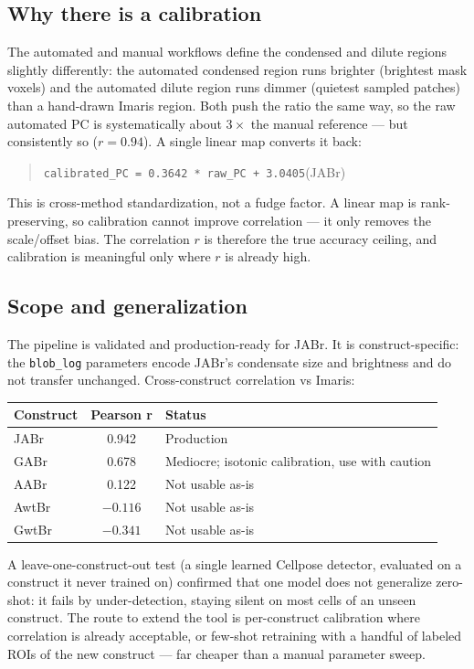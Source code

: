 \documentclass[11pt]{article}
\newcommand{\code}[1]{\texttt{\small #1}}
\begin{document}
\subsection{Why there is a calibration}
The automated and manual workflows define the condensed and dilute regions slightly
differently: the automated condensed region runs brighter (brightest mask voxels) and the
automated dilute region runs dimmer (quietest sampled patches) than a hand-drawn Imaris
region. Both push the ratio the same way, so the raw automated PC is systematically about
$3\times$ the manual reference --- but consistently so ($r = 0.94$). A single linear map converts it back:
\begin{quote}\code{calibrated\_PC = 0.3642 * raw\_PC + 3.0405}\quad (JABr)\end{quote}
This is cross-method standardization, not a fudge factor. A linear map is rank-preserving,
so calibration cannot improve correlation --- it only removes the scale/offset bias. The
correlation $r$ is therefore the true accuracy ceiling, and calibration is meaningful only where $r$ is already high.

\subsection{Scope and generalization}
The pipeline is validated and production-ready for JABr. It is construct-specific: the
\code{blob\_log} parameters encode JABr's condensate size and brightness and do not transfer
unchanged. Cross-construct correlation vs Imaris:
\begin{center}
\begin{tabular}{l c >{\RaggedRight}p{7cm}}
\toprule
\textbf{Construct} & \textbf{Pearson r} & \textbf{Status}\\
\midrule
JABr & 0.942 & Production\\
GABr & 0.678 & Mediocre; isotonic calibration, use with caution\\
AABr & 0.122 & Not usable as-is\\
AwtBr & $-0.116$ & Not usable as-is\\
GwtBr & $-0.341$ & Not usable as-is\\
\bottomrule
\end{tabular}
\end{center}
A leave-one-construct-out test (a single learned Cellpose detector, evaluated on a construct
it never trained on) confirmed that one model does not generalize zero-shot: it fails by
under-detection, staying silent on most cells of an unseen construct. The route to extend the
tool is per-construct calibration where correlation is already acceptable, or few-shot
retraining with a handful of labeled ROIs of the new construct --- far cheaper than a manual parameter sweep.
\newpage
\end{document}
